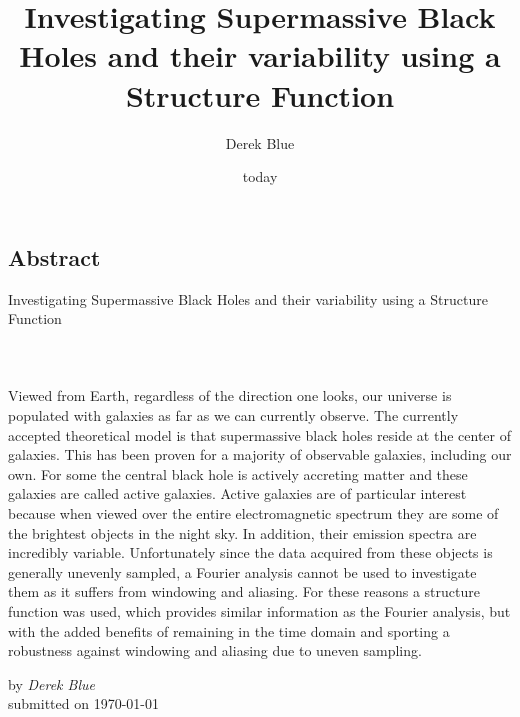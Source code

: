 \documentclass[12pt, oneside]{smuthesis}
\newcommand{\myTitle}{Investigating Supermassive Black Holes and their variability using a Structure Function}
\begin{document}
\frontmatter
\title{\sc \myTitle}
\author{Derek Blue}
\date{today}
\medskip

\maketitle
\pagestyle{headings}

\begin{center}
\section*{\center \sc Abstract} \label{abstract}
\sc \myTitle
\paragraph*{\center  \\}
\end{center}
Viewed from Earth, regardless of the direction one looks, our universe is populated with galaxies as far as we can currently observe. The currently accepted theoretical model is that supermassive black holes reside at the center of galaxies. This has been proven for a majority of observable galaxies, including our own. For some the central black hole is actively accreting matter and these galaxies are called active galaxies. Active galaxies are of particular interest because when viewed over the entire electromagnetic spectrum they are some of the brightest objects in the night sky. In addition, their emission spectra are incredibly variable. Unfortunately since the data acquired from these objects is generally unevenly sampled, a Fourier analysis cannot be used to investigate them as it suffers from windowing and aliasing. For these reasons a structure function was used, which provides similar information as the Fourier analysis, but with the added benefits of remaining in the time domain and sporting a robustness against windowing and aliasing due to uneven sampling.

\begin{center}
by {\em Derek Blue}\\
submitted on \today\\
\end{center}
\newpage

\tableofcontents
\listoffigures
\listoftables
\newpage
%
\mainmatter
\end{document}
